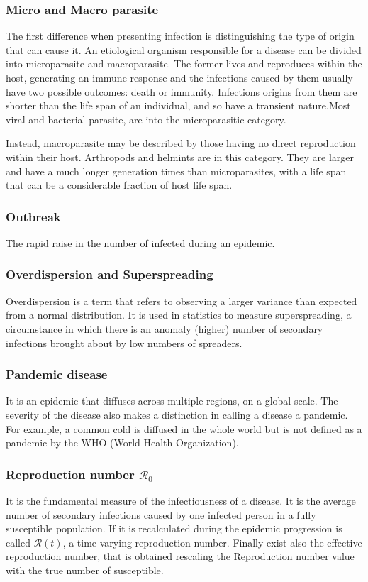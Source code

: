 \subsubsection{Micro and Macro parasite}
The first difference when presenting infection is distinguishing the type of origin that can cause it. An etiological organism responsible for a disease can be divided into microparasite and macroparasite. The former lives and reproduces within the host, generating an immune response and the infections caused by them usually have two possible outcomes: death or immunity. Infections origins from them are shorter than the life span of an individual, and so have a transient nature.Most viral and bacterial parasite, are into the microparasitic category.

Instead, macroparasite may be described by those having no direct reproduction within their host. Arthropods and helmints are in this category. They are larger and have a much longer generation times than microparasites, with a life span that can be a considerable fraction of host life span.


\subsubsection{Outbreak} The rapid raise in the number of infected during an epidemic.


\subsubsection{Overdispersion and Superspreading} Overdispersion is a term that refers to observing a larger variance than expected from a normal distribution. It is used in statistics to measure superspreading, a circumstance in which there is an anomaly (higher) number of secondary infections brought about by low numbers of spreaders.

\subsubsection{Pandemic disease} It is an epidemic that diffuses across multiple regions, on a global scale. The severity of the disease also makes a distinction in calling a disease a pandemic. For example, a common cold is diffused in the whole world but is not defined as a pandemic by the WHO (World Health Organization). 

\subsubsection{Reproduction number $\mathcal{R}_0$} It is the fundamental measure of the infectiousness of a disease. It is the average number of secondary infections caused by one infected person in a fully susceptible population. If it is recalculated during the epidemic progression is called $\mathcal{R}(t)$, a time-varying reproduction number. Finally exist also the effective reproduction number, that is obtained
rescaling the Reproduction number value with the true number of susceptible.

